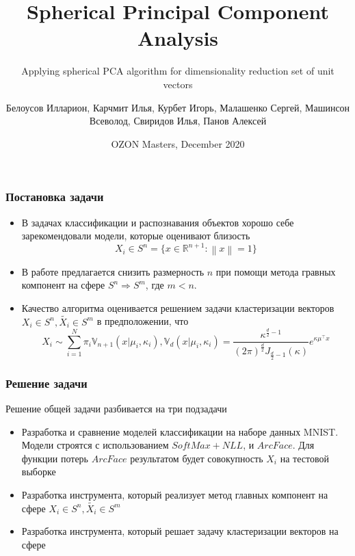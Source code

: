 \documentclass{beamer}
\title[Spherical Principal Component Analysis]{Spherical Principal Component Analysis}
\subtitle{Applying spherical PCA algorithm for dimensionality reduction set of unit vectors}
\author[] { Белоусов Илларион, Карчмит Илья, Курбет Игорь, Малашенко Сергей, Машинсон Всеволод, Свиридов Илья, Панов Алексей }
\date[]{OZON Masters, December 2020}
\begin{document}
\frame{\titlepage}

\begin{frame}
\frametitle{Постановка задачи}
\begin{itemize}
 \item В задачах классификации и распознавания объектов хорошо себе зарекомендовали модели, которые оценивают близость 
 $$X_i \in S^n = \{ x \in \mathbb{R}^{n+1} : \left\lVert x \right\rVert=1 \}$$
 \item В работе предлагается снизить размерность $n$ при помощи метода гравных компонент на сфере $S^n \Rightarrow S^m$, где $m < n$.
 \item Качество алгоритма оценивается решением задачи кластеризации векторов $X_i \in S^n, \tilde{X_i} \in S^m$ в предположении, что $$X_i \sim \sum_{i=1}^{N}\pi_i \mathbb{V}_{n+1}(x | \mu_i, \kappa_i), \mathbb{V}_d(x | \mu_i, \kappa_i)=\frac{\kappa^{\frac{d}{2}-1}}{(2\pi)^{\frac{d}{2}}J_{\frac{d}{2}-1}(\kappa)} e^{\kappa \mu^{\top} x}$$
\end{itemize}
\end{frame}

\begin{frame}
\frametitle{Решение задачи}
Решение общей задачи разбивается на три подзадачи
\begin{itemize}
 \item Разработка и сравнение моделей классификации на наборе данных MNIST. Модели строятся с использованием $SoftMax + NLL$, и $ArcFace$. Для функции потерь $ArcFace$ результатом будет совокупность $X_i$ на тестовой выборке
\item Разработка инструмента, который реализует метод главных компонент на сфере $X_i \in S^n, \tilde{X_i} \in S^m$
\item Разработка инструмента, который решает задачу кластеризации векторов на сфере
\end{itemize}

\end{frame}
\end{document}
